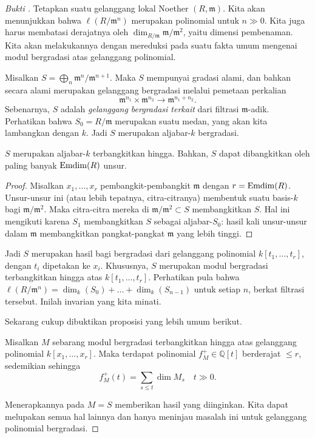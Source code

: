 \begin{proof}[Bukti ]
Tetapkan suatu gelanggang lokal Noether $(R, \mathfrak{m})$. Kita akan menunjukkan bahwa
$\ell(R/\mathfrak{m}^n)$ merupakan polinomial untuk $n \gg 0$. Kita juga harus membatasi
derajatnya oleh $\dim_{R/\mathfrak{m}} \mathfrak{m}/\mathfrak{m}^2$, yaitu
dimensi pembenaman. Kita akan melakukannya dengan mereduksi pada suatu fakta umum mengenai
modul bergradasi atas gelanggang polinomial.

Misalkan $S = \bigoplus_n  \mathfrak{m}^n/\mathfrak{m}^{n+1}$. Maka $S$ mempunyai
gradasi alami, dan bahkan secara alami merupakan gelanggang bergradasi melalui
pemetaan perkalian 
\[ \mathfrak{m}^{n_1} \times \mathfrak{m}^{n_2} \to \mathfrak{m}^{n_1 + n_2}.  \]
Sebenarnya, $S$ adalah \emph{gelanggang bergradasi terkait} dari filtrasi $\mathfrak{m}$-adik.
Perhatikan bahwa $S_0 = R/\mathfrak{m}$ merupakan suatu medan, yang akan kita lambangkan dengan $k$.
Jadi $S$ merupakan aljabar-$k$ bergradasi.

\begin{lemma} 
$S$ merupakan aljabar-$k$ terbangkitkan hingga. Bahkan, $S$ dapat dibangkitkan oleh paling banyak
$\operatorname{Emdim}(R)$ unsur.
\end{lemma} 
\begin{proof} 
Misalkan $x_1, \dots, x_r$ pembangkit-pembangkit $\mathfrak{m} $ dengan $r = \operatorname{Emdim}(R)$.
Unsur-unsur ini (atau lebih tepatnya, citra-citranya) membentuk suatu basis-$k$
bagi $\mathfrak{m}/\mathfrak{m}^2$.
Maka citra-citra mereka di $\mathfrak{m}/\mathfrak{m}^2 \subset S$ membangkitkan $S$.
Hal ini mengikuti karena $S_1$ membangkitkan $S$ sebagai aljabar-$S_0$: hasil kali
unsur-unsur dalam $\mathfrak{m}$ membangkitkan pangkat-pangkat $\mathfrak{m}$ yang lebih tinggi.
\end{proof} 

Jadi $S$ merupakan hasil bagi bergradasi dari gelanggang polinomial $k[t_1, \dots, t_r]$, dengan
$t_i $ dipetakan ke $x_i$. Khususnya, $S$ merupakan modul bergradasi terbangkitkan hingga atas $k[t_1,
\dots, t_r]$.
Perhatikan pula bahwa $\ell(R/\mathfrak{m}^n)  = \dim_{k}(S_0) + \dots +
\dim_{k}(S_{n-1})$ untuk setiap $n$, berkat filtrasi tersebut. Inilah
invarian yang kita minati.

Sekarang cukup dibuktikan proposisi yang lebih umum berikut.
\begin{proposition} \label{hilbfngeneral}
Misalkan $M$ sebarang modul bergradasi terbangkitkan hingga atas gelanggang polinomial
$k[x_1, \dots, x_r]$. Maka
terdapat polinomial $f_M^+ \in \mathbb{Q}[t]$ berderajat $ \leq r$, sedemikian sehingga
\[ f_M^+(t) = \sum_{s \leq t} \dim M_s \quad t \gg 0.   \]
\end{proposition} 
Menerapkannya pada $M = S$ memberikan hasil yang diinginkan. Kita dapat melupakan
semua hal lainnya dan hanya meninjau masalah ini untuk gelanggang polinomial bergradasi.


\end{proof}

